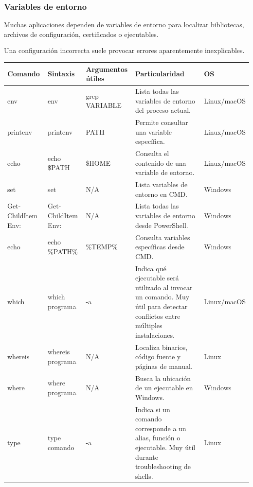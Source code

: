\documentclass[a4paper,10pt]{article}
\begin{document}

\subsubsection{Variables de entorno}

Muchas aplicaciones dependen de variables de entorno para localizar
bibliotecas, archivos de configuración, certificados o ejecutables.

Una configuración incorrecta suele provocar errores aparentemente
inexplicables.

\begin{longtable}{|p{2.8cm}|p{3cm}|p{4cm}|p{5.6cm}|p{1.5cm}|}

\hline
Comando &
Sintaxis &
Argumentos útiles &
Particularidad &
OS
\\
\hline
\endhead

env &
env &
grep VARIABLE &
Lista todas las variables de entorno del proceso actual. &
Linux/macOS
\\
\hline

printenv &
printenv &
PATH &
Permite consultar una variable específica. &
Linux/macOS
\\
\hline

echo &
echo \$PATH &
\$HOME &
Consulta el contenido de una variable de entorno. &
Linux/macOS
\\
\hline

set &
set &
N/A &
Lista variables de entorno en CMD. &
Windows
\\
\hline

Get-ChildItem Env: &
Get-ChildItem Env: &
N/A &
Lista todas las variables de entorno desde PowerShell. &
Windows
\\
\hline

echo &
echo \%PATH\% &
\%TEMP\% &
Consulta variables específicas desde CMD. &
Windows
\\
\hline

which &
which programa &
-a &
Indica qué ejecutable será utilizado al invocar un comando. Muy útil para detectar conflictos entre múltiples instalaciones. &
Linux/macOS
\\
\hline

whereis &
whereis programa &
N/A &
Localiza binarios, código fuente y páginas de manual. &
Linux
\\
\hline

where &
where programa &
N/A &
Busca la ubicación de un ejecutable en Windows. &
Windows
\\
\hline

type &
type comando &
-a &
Indica si un comando corresponde a un alias, función o ejecutable. Muy útil durante troubleshooting de shells. &
Linux
\\
\hline

\end{longtable}
\end{document}

